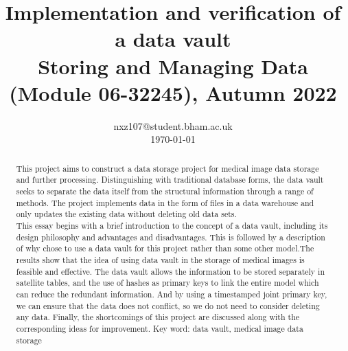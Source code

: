 \documentclass[conference]{IEEEtran}
\begin{document}
\title{Implementation and verification of a data vault\\\Large Storing and Managing Data (Module 06-32245), Autumn 2022}

\author{
nxz107@student.bham.ac.uk\\%
\today}


\maketitle

\begin{abstract}
This project aims to construct a data storage project for medical image data storage and further processing. Distinguishing with traditional database forms, the data vault seeks to separate the data itself from the structural information through a range of methods. The project implements data in the form of files in a data warehouse and only updates the existing data without deleting old data sets.\\
This essay begins with a brief introduction to the concept of a data vault\cite{b1}, including its design philosophy and advantages and disadvantages. This is followed by a description of why chose to use a data vault for this project rather than some other model.The results show that the idea of using data vault in the storage of medical images is feasible and effective. The data vault allows the information to be stored separately in satellite tables, and the use of hashes as primary keys to link the entire model which can reduce the redundant information. And by using a timestamped joint primary key, we can ensure that the data does not conflict, so we do not need to consider deleting any data. Finally, the shortcomings of this project are discussed along with the corresponding ideas for improvement.
Key word: data vault, medical image data storage
\end{abstract}

\end{document}
